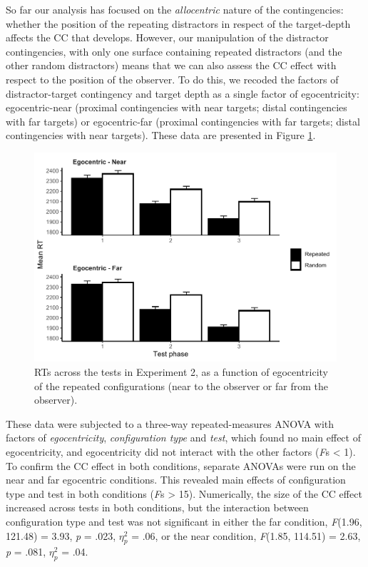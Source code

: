 \documentclass[
  english,
  man,floatsintext]{apa7}
\begin{document}
So far our analysis has focused on the \emph{allocentric} nature of the contingencies: whether the position of the repeating distractors in respect of the target-depth affects the CC that develops. However, our manipulation of the distractor contingencies, with only one surface containing repeated distractors (and the other random distractors) means that we can also assess the CC effect with respect to the position of the observer. To do this, we recoded the factors of distractor-target contingency and target depth as a single factor of egocentricity: egocentric-near (proximal contingencies with near targets; distal contingencies with far targets) or egocentric-far (proximal contingencies with far targets; distal contingencies with near targets). These data are presented in Figure \ref{fig:Exp2-ego-figure}.



\begin{figure}

{\centering \includegraphics[width=1\linewidth]{CCVR_manuscript_files/figure-latex/Exp2-ego-figure-1} 

}

\caption{RTs across the tests in Experiment 2, as a function of egocentricity of the repeated configurations (near to the observer or far from the observer).}\label{fig:Exp2-ego-figure}
\end{figure}

These data were subjected to a three-way repeated-measures ANOVA with factors of \emph{egocentricity}, \emph{configuration type} and \emph{test}, which found no main effect of egocentricity, and egocentricity did not interact with the other factors (\emph{F}s \textless{} 1). To confirm the CC effect in both conditions, separate ANOVAs were run on the near and far egocentric conditions. This revealed main effects of configuration type and test in both conditions (\emph{F}s \textgreater{} 15). Numerically, the size of the CC effect increased across tests in both conditions, but the interaction between configuration type and test was not significant in either the far condition, \emph{F}(1.96, 121.48) = 3.93, \emph{p} = .023, \(\eta^2_p\) = .06, or the near condition, \emph{F}(1.85, 114.51) = 2.63, \emph{p} = .081, \(\eta^2_p\) = .04.
\end{document}
